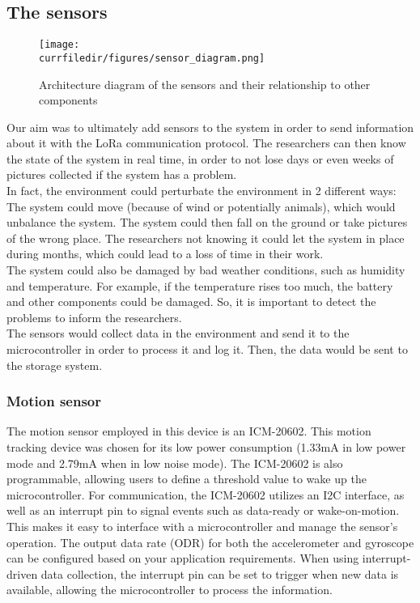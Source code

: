 \newpage
\subsection{The sensors}
\begin{figure}[!h]
    \centering
    \texttt{[image: \\currfiledir/figures/sensor\_diagram.png]}
    \caption{Architecture diagram of the sensors and their relationship to other components}
\end{figure}

\noindent Our aim was to ultimately add sensors to the system in order to send information about it with the LoRa communication protocol. The researchers can then know the state of the system in real time, in order to not lose days or even weeks of pictures collected if the system has a problem.\\
In fact, the environment could perturbate the environment in 2 different ways:\\
The system could move (because of wind or potentially animals), which would unbalance the system. The system could then fall on the ground or take pictures of the wrong place. The researchers not knowing it could let the system in place during months, which could lead to a loss of time in their work.\\
The system could also be damaged by bad weather conditions, such as humidity and temperature. For example, if the temperature rises too much, the battery and other components could be damaged. So, it is important to detect the problems to inform the researchers.\\
The sensors would collect data in the environment and send it to the microcontroller in order to process it and log it. Then, the data would be sent to the storage system.




\newpage
\subsubsection{Motion sensor}
The motion sensor employed in this device is an ICM-20602. This motion tracking device was chosen for its low power consumption (1.33mA in low power mode and 2.79mA when in low noise mode). The ICM-20602 is also programmable, allowing users to define a threshold value to wake up the microcontroller.
For communication, the ICM-20602 utilizes an I2C interface, as well as an interrupt pin to signal events such as data-ready or wake-on-motion. This makes it easy to interface with a microcontroller and manage the sensor's operation.
The output data rate (ODR) for both the accelerometer and gyroscope can be configured based on your application requirements. When using interrupt-driven data collection, the interrupt pin can be set to trigger when new data is available, allowing the microcontroller to process the information.

